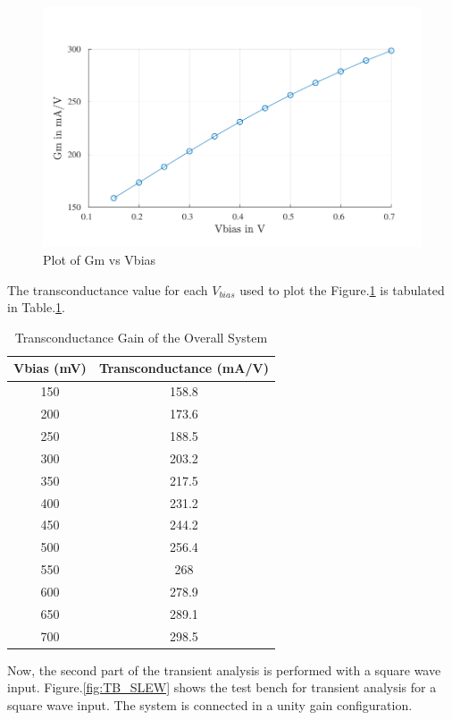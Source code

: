 \begin{figure} [H]
\centering
\includegraphics[scale=1]{Figures/Plots/Ov_Gm.pdf}
\caption{Plot of Gm vs Vbias}
\label{fig:GM}
\end{figure}

The transconductance value for each $V_{bias}$ used to plot the Figure.\ref{fig:GM} is tabulated in Table.\ref{tab:GM}.

\begin{table} [H]
\centering
\begin{tabular}{@{}cc@{}}
\toprule
Vbias (mV)			& Transconductance (mA/V)	\\ \midrule
150					& 158.8 \\
200					& 173.6 \\
250					& 188.5 \\
300					& 203.2 \\
350					& 217.5 \\
400					& 231.2 \\
450					& 244.2 \\
500					& 256.4 \\
550					& 268 \\
600					& 278.9 \\
650					& 289.1 \\
700 				& 298.5 \\
\bottomrule
\end{tabular}
\caption{Transconductance Gain of the Overall System}
\label{tab:GM}
\end{table}

Now, the second part of the transient analysis is performed with a square wave input. Figure.\ref{fig:TB_SLEW} shows the test bench for transient analysis for a square wave input. The system is connected in a unity gain configuration.


